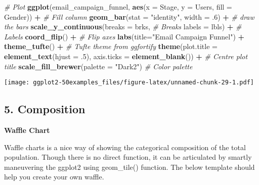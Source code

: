 \documentclass[a4paper]{article}
\newenvironment{Shaded}{\begin{snugshade}}{\end{snugshade}}
\newcommand{\KeywordTok}[1]{\textcolor[rgb]{0.13,0.29,0.53}{\textbf{#1}}}
\newcommand{\DataTypeTok}[1]{\textcolor[rgb]{0.13,0.29,0.53}{#1}}
\newcommand{\DecValTok}[1]{\textcolor[rgb]{0.00,0.00,0.81}{#1}}
\newcommand{\StringTok}[1]{\textcolor[rgb]{0.31,0.60,0.02}{#1}}
\newcommand{\CommentTok}[1]{\textcolor[rgb]{0.56,0.35,0.01}{\textit{#1}}}
\newcommand{\OperatorTok}[1]{\textcolor[rgb]{0.81,0.36,0.00}{\textbf{#1}}}
\newcommand{\NormalTok}[1]{#1}
\begin{document}
\begin{Shaded}
\begin{Highlighting}[]
\CommentTok{# Plot}
\KeywordTok{ggplot}\NormalTok{(email_campaign_funnel, }\KeywordTok{aes}\NormalTok{(}\DataTypeTok{x =}\NormalTok{ Stage, }\DataTypeTok{y =}\NormalTok{ Users, }\DataTypeTok{fill =}\NormalTok{ Gender)) }\OperatorTok{+}\StringTok{   }\CommentTok{# Fill column}
\StringTok{                              }\KeywordTok{geom_bar}\NormalTok{(}\DataTypeTok{stat =} \StringTok{"identity"}\NormalTok{, }\DataTypeTok{width =}\NormalTok{ .}\DecValTok{6}\NormalTok{) }\OperatorTok{+}\StringTok{   }\CommentTok{# draw the bars}
\StringTok{                              }\KeywordTok{scale_y_continuous}\NormalTok{(}\DataTypeTok{breaks =}\NormalTok{ brks,   }\CommentTok{# Breaks}
                                                 \DataTypeTok{labels =}\NormalTok{ lbls) }\OperatorTok{+}\StringTok{ }\CommentTok{# Labels}
\StringTok{                              }\KeywordTok{coord_flip}\NormalTok{() }\OperatorTok{+}\StringTok{  }\CommentTok{# Flip axes}
\StringTok{                              }\KeywordTok{labs}\NormalTok{(}\DataTypeTok{title=}\StringTok{"Email Campaign Funnel"}\NormalTok{) }\OperatorTok{+}
\StringTok{                              }\KeywordTok{theme_tufte}\NormalTok{() }\OperatorTok{+}\StringTok{  }\CommentTok{# Tufte theme from ggfortify}
\StringTok{                              }\KeywordTok{theme}\NormalTok{(}\DataTypeTok{plot.title =} \KeywordTok{element_text}\NormalTok{(}\DataTypeTok{hjust =}\NormalTok{ .}\DecValTok{5}\NormalTok{), }
                                    \DataTypeTok{axis.ticks =} \KeywordTok{element_blank}\NormalTok{()) }\OperatorTok{+}\StringTok{   }\CommentTok{# Centre plot title}
\StringTok{                              }\KeywordTok{scale_fill_brewer}\NormalTok{(}\DataTypeTok{palette =} \StringTok{"Dark2"}\NormalTok{)  }\CommentTok{# Color palette}
\end{Highlighting}
\end{Shaded}

\texttt{[image: ggplot2-50examples\_files/figure-latex/unnamed-chunk-29-1.pdf]}

\newpage

\subsection{5. Composition}\label{composition}

\textbf{Waffle Chart}

Waffle charts is a nice way of showing the categorical composition of
the total population. Though there is no direct function, it can be
articulated by smartly maneuvering the ggplot2 using geom\_tile()
function. The below template should help you create your own waffle.
\end{document}
